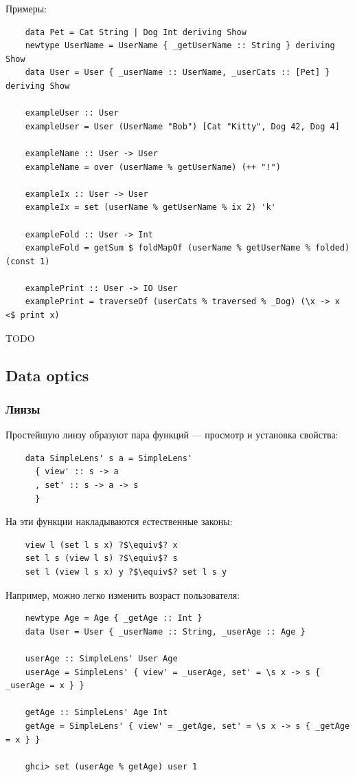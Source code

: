 Примеры:
\begin{verbatim}
    data Pet = Cat String | Dog Int deriving Show
    newtype UserName = UserName { _getUserName :: String } deriving Show
    data User = User { _userName :: UserName, _userCats :: [Pet] } deriving Show

    exampleUser :: User
    exampleUser = User (UserName "Bob") [Cat "Kitty", Dog 42, Dog 4]

    exampleName :: User -> User
    exampleName = over (userName % getUserName) (++ "!")

    exampleIx :: User -> User
    exampleIx = set (userName % getUserName % ix 2) 'k'

    exampleFold :: User -> Int
    exampleFold = getSum $ foldMapOf (userName % getUserName % folded) (const 1)

    examplePrint :: User -> IO User
    examplePrint = traverseOf (userCats % traversed % _Dog) (\x -> x <$ print x)
\end{verbatim}

TODO %

\subsection{Data optics}

\subsubsection{Линзы}

Простейшую линзу образуют пара функций --- просмотр и установка свойства:
\begin{verbatim}
    data SimpleLens' s a = SimpleLens'
      { view' :: s -> a
      , set' :: s -> a -> s
      }
\end{verbatim}

На эти функции накладываются естественные законы:
\begin{verbatim}
    view l (set l s x) ?$\equiv$? x
    set l s (view l s) ?$\equiv$? s
    set l (view l s x) y ?$\equiv$? set l s y
\end{verbatim}

Например, можно легко изменить возраст пользователя:
\begin{verbatim}
    newtype Age = Age { _getAge :: Int }
    data User = User { _userName :: String, _userAge :: Age }

    userAge :: SimpleLens' User Age
    userAge = SimpleLens' { view' = _userAge, set' = \s x -> s { _userAge = x } }

    getAge :: SimpleLens' Age Int
    getAge = SimpleLens' { view' = _getAge, set' = \s x -> s { _getAge = x } }

    ghci> set (userAge % getAge) user 1
\end{verbatim}

